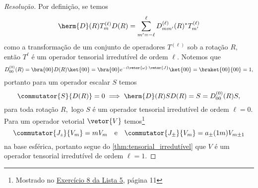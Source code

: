 \begin{proof}[Resolução]
   Por definição, se temos
   \begin{equation*}
      \herm{D}(R) T^{(\ell)}_m D(R) = \sum_{m' = - \ell}^\ell D^{(\ell)}_{mm'}(R)^* T^{(\ell)}_{m'}
   \end{equation*}
   como a transformação de um conjunto de operadores \(T^{(\ell)}\) sob a rotação \(R,\) então \(T^{\ell}\) é um operador tensorial irredutível de ordem \(\ell\). Notemos que
   \begin{equation*}
      D^{(0)}_{00}(R) = \bra{00}D(R)\ket{00} = \bra{00}e^{-i \vetor{\omega}\cdot \vetor{J}}\ket{00} = \braket{00}{00} = 1,
   \end{equation*}
   portanto para um operador escalar \(S\) temos
   \begin{equation*}
      \commutator{S}{D(R)} = 0 \implies \herm{D}(R) S D(R) = S = D^{(0)}_{00}(R) S,
   \end{equation*}
   para toda rotação \(R,\) logo \(S\) é um operador tensorial irredutível de ordem \(\ell = 0.\) Para um operador vetorial \(\vetor{V}\) temos\footnote{Mostrado no \href{https://github.com/louisradial/4305001-mecanica-quantica/releases/tag/lista5}{Exercício 8 da Lista 5,} página 11}
   \begin{equation*}
      \commutator{J_z}{V_m} = m V_m\quad\text{e}\quad\commutator{J_\pm}{V_m} = a_\pm(1m)V_{m\pm1}
   \end{equation*}
   na base esférica, portanto segue do \cref{thm:tensorial_irredutível} que \(V\) é um operador tensorial irredutível de ordem \(\ell = 1.\)


\end{proof}
